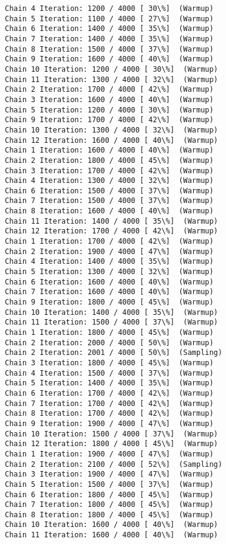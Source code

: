 \documentclass[11pt]{article}
\begin{document}
\begin{Verbatim}[commandchars=\\\{\}]
Chain 4 Iteration: 1200 / 4000 [ 30\%]  (Warmup)
Chain 5 Iteration: 1100 / 4000 [ 27\%]  (Warmup)
Chain 6 Iteration: 1400 / 4000 [ 35\%]  (Warmup)
Chain 7 Iteration: 1400 / 4000 [ 35\%]  (Warmup)
Chain 8 Iteration: 1500 / 4000 [ 37\%]  (Warmup)
Chain 9 Iteration: 1600 / 4000 [ 40\%]  (Warmup)
Chain 10 Iteration: 1200 / 4000 [ 30\%]  (Warmup)
Chain 11 Iteration: 1300 / 4000 [ 32\%]  (Warmup)
Chain 2 Iteration: 1700 / 4000 [ 42\%]  (Warmup)
Chain 3 Iteration: 1600 / 4000 [ 40\%]  (Warmup)
Chain 5 Iteration: 1200 / 4000 [ 30\%]  (Warmup)
Chain 9 Iteration: 1700 / 4000 [ 42\%]  (Warmup)
Chain 10 Iteration: 1300 / 4000 [ 32\%]  (Warmup)
Chain 12 Iteration: 1600 / 4000 [ 40\%]  (Warmup)
Chain 1 Iteration: 1600 / 4000 [ 40\%]  (Warmup)
Chain 2 Iteration: 1800 / 4000 [ 45\%]  (Warmup)
Chain 3 Iteration: 1700 / 4000 [ 42\%]  (Warmup)
Chain 4 Iteration: 1300 / 4000 [ 32\%]  (Warmup)
Chain 6 Iteration: 1500 / 4000 [ 37\%]  (Warmup)
Chain 7 Iteration: 1500 / 4000 [ 37\%]  (Warmup)
Chain 8 Iteration: 1600 / 4000 [ 40\%]  (Warmup)
Chain 11 Iteration: 1400 / 4000 [ 35\%]  (Warmup)
Chain 12 Iteration: 1700 / 4000 [ 42\%]  (Warmup)
Chain 1 Iteration: 1700 / 4000 [ 42\%]  (Warmup)
Chain 2 Iteration: 1900 / 4000 [ 47\%]  (Warmup)
Chain 4 Iteration: 1400 / 4000 [ 35\%]  (Warmup)
Chain 5 Iteration: 1300 / 4000 [ 32\%]  (Warmup)
Chain 6 Iteration: 1600 / 4000 [ 40\%]  (Warmup)
Chain 7 Iteration: 1600 / 4000 [ 40\%]  (Warmup)
Chain 9 Iteration: 1800 / 4000 [ 45\%]  (Warmup)
Chain 10 Iteration: 1400 / 4000 [ 35\%]  (Warmup)
Chain 11 Iteration: 1500 / 4000 [ 37\%]  (Warmup)
Chain 1 Iteration: 1800 / 4000 [ 45\%]  (Warmup)
Chain 2 Iteration: 2000 / 4000 [ 50\%]  (Warmup)
Chain 2 Iteration: 2001 / 4000 [ 50\%]  (Sampling)
Chain 3 Iteration: 1800 / 4000 [ 45\%]  (Warmup)
Chain 4 Iteration: 1500 / 4000 [ 37\%]  (Warmup)
Chain 5 Iteration: 1400 / 4000 [ 35\%]  (Warmup)
Chain 6 Iteration: 1700 / 4000 [ 42\%]  (Warmup)
Chain 7 Iteration: 1700 / 4000 [ 42\%]  (Warmup)
Chain 8 Iteration: 1700 / 4000 [ 42\%]  (Warmup)
Chain 9 Iteration: 1900 / 4000 [ 47\%]  (Warmup)
Chain 10 Iteration: 1500 / 4000 [ 37\%]  (Warmup)
Chain 12 Iteration: 1800 / 4000 [ 45\%]  (Warmup)
Chain 1 Iteration: 1900 / 4000 [ 47\%]  (Warmup)
Chain 2 Iteration: 2100 / 4000 [ 52\%]  (Sampling)
Chain 3 Iteration: 1900 / 4000 [ 47\%]  (Warmup)
Chain 5 Iteration: 1500 / 4000 [ 37\%]  (Warmup)
Chain 6 Iteration: 1800 / 4000 [ 45\%]  (Warmup)
Chain 7 Iteration: 1800 / 4000 [ 45\%]  (Warmup)
Chain 8 Iteration: 1800 / 4000 [ 45\%]  (Warmup)
Chain 10 Iteration: 1600 / 4000 [ 40\%]  (Warmup)
Chain 11 Iteration: 1600 / 4000 [ 40\%]  (Warmup)

\end{Verbatim}
\end{document}
